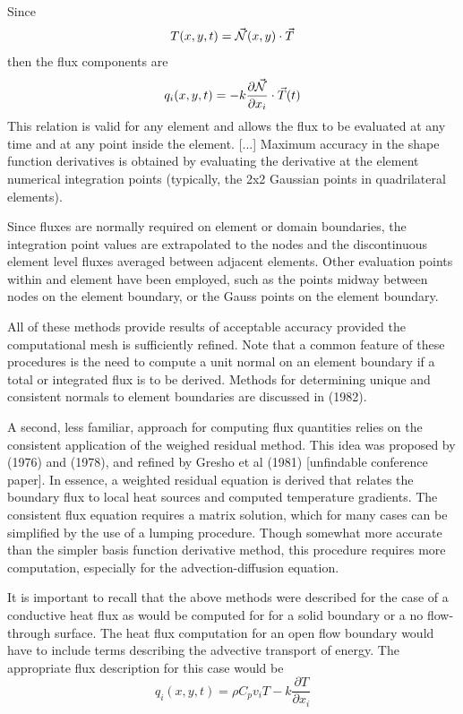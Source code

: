 \begin{displayquote}
{\color{MidnightBlue} 
Since 
\[
T(x,y,t)=\vec{{\mathcal{N}}}(x,y) \cdot \vec{T} 
\]
then the flux components are
\[
q_i(x,y,t)=-k \frac{\partial \vec{{\mathcal{N}}}}{\partial x_i} \cdot \vec{T}(t)
\]
This relation is valid for any element and allows the flux to be evaluated 
at any time and at any point inside the element.
[...]
Maximum accuracy in the shape function derivatives is obtained by evaluating the derivative at the element numerical integration points
(typically, the 2x2 Gaussian points in quadrilateral elements).

Since fluxes are normally required on element or domain boundaries, the integration point values are extrapolated to the nodes and the discontinuous element level fluxes averaged between adjacent elements.
Other evaluation points within and element have been employed, such as the points midway between nodes on the element boundary, or the Gauss points on the element boundary.

All of these methods provide results of acceptable accuracy provided the computational mesh is 
sufficiently refined. Note that a common feature of these procedures is the need to compute a unit normal on an element boundary if a total or integrated flux is to be derived. Methods for determining 
unique and consistent normals to element boundaries are discussed in \textcite{ensg82} (1982).

A second, less familiar, approach for computing flux quantities relies on the consistent application
of the weighed residual method. This idea was proposed by \textcite{lahe76} (1976) 
and \textcite{mahz78} (1978), and refined by Gresho et al (1981) [unfindable conference paper].
In essence, a weighted residual equation is derived that relates the boundary flux to local heat sources and computed temperature gradients. The consistent flux equation requires a matrix solution, 
which for many cases can be simplified by the use of a lumping procedure. 
Though somewhat more accurate than the simpler basis function derivative method, this procedure 
requires more computation, especially for the advection-diffusion equation.

It is important to recall that the above methods were described for the case
of a conductive heat flux as would be computed for for a solid boundary or a no flow-through surface.
The heat flux computation for an open flow boundary would have to include terms describing the 
advective transport of energy. 
The appropriate flux description for this case would be
\[
q_i(x,y,t)=\rho C_p v_i T -k \frac{\partial T}{\partial x_i} 
\]

}
\end{displayquote}






